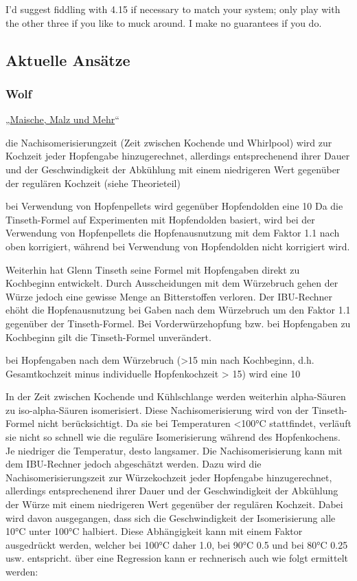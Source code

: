 \documentclass[a4paper,parskip=half]{scrartcl}
\begin{document}
I'd suggest fiddling with 4.15 if necessary to match your system; only play with the other three if you like to muck around. I make no guarantees if you do.

\subsection*{Aktuelle Ansätze}

\subsubsection*{Wolf}

„\href{https://www.maischemalzundmehr.de/index.php?inhaltmitte=toolsiburechner}{Maische, Malz und Mehr}“

die Nachisomerisierungzeit (Zeit zwischen Kochende und Whirlpool) wird zur Kochzeit jeder Hopfengabe hinzugerechnet, allerdings entsprechenend ihrer Dauer und der Geschwindigkeit der Abkühlung mit einem niedrigeren Wert gegenüber der regulären Kochzeit (siehe Theorieteil) 

bei Verwendung von Hopfenpellets wird gegenüber Hopfendolden eine 10%
Da die Tinseth-Formel auf Experimenten mit Hopfendolden basiert, wird bei der Verwendung von Hopfenpellets die Hopfenausnutzung mit dem Faktor 1.1 nach oben korrigiert, während bei Verwendung von Hopfendolden nicht korrigiert wird. 

Weiterhin hat Glenn Tinseth seine Formel mit Hopfengaben direkt zu Kochbeginn entwickelt. Durch Ausscheidungen mit dem Würzebruch gehen der Würze jedoch eine gewisse Menge an Bitterstoffen verloren. Der IBU-Rechner ehöht die Hopfenausnutzung bei Gaben nach dem Würzebruch um den Faktor 1.1 gegenüber der Tinseth-Formel. Bei Vorderwürzehopfung bzw. bei Hopfengaben zu Kochbeginn gilt die Tinseth-Formel unverändert. 

bei Hopfengaben nach dem Würzebruch (>15 min nach Kochbeginn, d.h. Gesamtkochzeit minus individuelle Hopfenkochzeit > 15) wird eine 10%

In der Zeit zwischen Kochende und Kühlschlange werden weiterhin alpha-Säuren zu iso-alpha-Säuren isomerisiert. Diese Nachisomerisierung wird von der Tinseth-Formel nicht berücksichtigt. Da sie bei Temperaturen <100°C stattfindet, verläuft sie nicht so schnell wie die reguläre Isomerisierung während des Hopfenkochens. Je niedriger die Temperatur, desto langsamer. Die Nachisomerisierung kann mit dem IBU-Rechner jedoch abgeschätzt werden. Dazu wird die Nachisomerisierungszeit zur Würzekochzeit jeder Hopfengabe hinzugerechnet, allerdings entsprechenend ihrer Dauer und der Geschwindigkeit der Abkühlung der Würze mit einem niedrigeren Wert gegenüber der regulären Kochzeit. Dabei wird davon ausgegangen, dass sich die Geschwindigkeit der Isomerisierung alle 10°C unter 100°C halbiert. Diese Abhängigkeit kann mit einem Faktor ausgedrückt werden, welcher bei 100°C daher 1.0, bei 90°C 0.5 und bei 80°C 0.25 usw. entspricht. über eine Regression kann er rechnerisch auch wie folgt ermittelt werden: 
\end{document}
